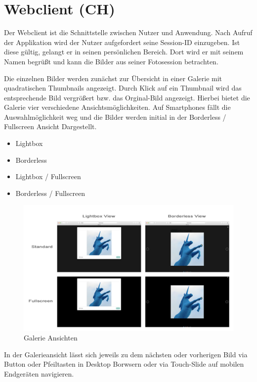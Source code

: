 \section{Webclient (CH)}
\label{section_webclient}
Der Webclient ist die Schnittstelle zwischen Nutzer und Anwendung. Nach Aufruf der Applikation wird der Nutzer aufgefordert seine Session-ID einzugeben. Ist diese gültig, gelangt er in seinen persönlichen Bereich. Dort wird er mit seinem Namen begrüßt und kann die Bilder aus seiner Fotosession betrachten. 

Die einzelnen Bilder werden zunächst zur Übersicht in einer Galerie mit quadratischen Thumbnails angezeigt. Durch Klick auf ein Thumbnail wird das entsprechende Bild vergrößert bzw. das Orginal-Bild angezeigt. Hierbei bietet die Galerie vier verschiedene Ansichtsmöglichkeiten. Auf Smartphones fällt die Auswahlmöglichkeit weg und die Bilder werden initial in der Borderless / Fullscreen Ansicht Dargestellt. 

\begin{itemize}
	\item Lightbox
	\item Borderless
	\item Lightbox / Fullscreen
	\item Borderless / Fullscreen
\end{itemize}

\begin{figure}[h]
	\centering
	\includegraphics[width=14cm]{bilder/gallery_view}
	\caption{Galerie Ansichten}
	\label{fig_galerie_ansichten}
\end{figure}

In der Galerieansicht lässt sich jeweils zu dem nächsten oder vorherigen Bild via Button oder Pfeiltasten in Desktop Borwsern oder via Touch-Slide auf mobilen Endgeräten navigieren. 


